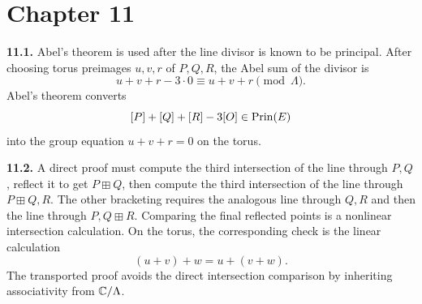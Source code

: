 \section{Chapter 11}

\textbf{11.1.} Abel's theorem is used after the line divisor is known to be
principal.  After choosing torus preimages \(u,v,r\) of \(P,Q,R\), the Abel sum
of the divisor is
\[
  u+v+r-3\cdot0\equiv u+v+r\pmod{\Lambda}.
\]
Abel's theorem converts
\[
  [P]+[Q]+[R]-3[O]\in\operatorname{Prin}(E)
\]
into the group equation \(u+v+r=0\) on the torus.

\begin{center}
\end{center}

\textbf{11.2.} A direct proof must compute the third intersection of the line
through \(P,Q\), reflect it to get \(P\boxplus Q\), then compute the third
intersection of the line through \(P\boxplus Q,R\).  The other bracketing
requires the analogous line through \(Q,R\) and then the line through
\(P,Q\boxplus R\).  Comparing the final reflected points is a nonlinear
intersection calculation.  On the torus, the corresponding check is the linear
calculation
\[
  (u+v)+w=u+(v+w).
\]
The transported proof avoids the direct intersection comparison by inheriting
associativity from \(\mathbb{C}/\Lambda\).

\begin{center}
\end{center}

